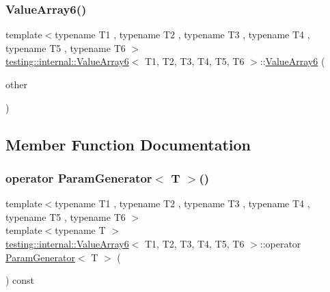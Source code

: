 \mbox{\label{classtesting_1_1internal_1_1_value_array6_a270702109b4185c6749310902fed7456}} 
\subsubsection{\texorpdfstring{ValueArray6()}{ValueArray6()}\hspace{0.1cm}{\footnotesize\ttfamily [2/2]}}
{\footnotesize\ttfamily template$<$typename T1 , typename T2 , typename T3 , typename T4 , typename T5 , typename T6 $>$ \\
\mbox{\hyperlink{classtesting_1_1internal_1_1_value_array6}{testing\+::internal\+::\+Value\+Array6}}$<$ T1, T2, T3, T4, T5, T6 $>$\+::\mbox{\hyperlink{classtesting_1_1internal_1_1_value_array6}{Value\+Array6}} (\begin{DoxyParamCaption}\item[{const \mbox{\hyperlink{classtesting_1_1internal_1_1_value_array6}{Value\+Array6}}$<$ T1, T2, T3, T4, T5, T6 $>$ \&}]{other }\end{DoxyParamCaption})\hspace{0.3cm}{\ttfamily [inline]}}



\subsection{Member Function Documentation}
\mbox{\label{classtesting_1_1internal_1_1_value_array6_ab6cb557146bca7cf5fcfa40f10dee9da}} 
\subsubsection{\texorpdfstring{operator ParamGenerator$<$ T $>$()}{operator ParamGenerator< T >()}}
{\footnotesize\ttfamily template$<$typename T1 , typename T2 , typename T3 , typename T4 , typename T5 , typename T6 $>$ \\
template$<$typename T $>$ \\
\mbox{\hyperlink{classtesting_1_1internal_1_1_value_array6}{testing\+::internal\+::\+Value\+Array6}}$<$ T1, T2, T3, T4, T5, T6 $>$\+::operator \mbox{\hyperlink{classtesting_1_1internal_1_1_param_generator}{Param\+Generator}}$<$ T $>$ (\begin{DoxyParamCaption}{ }\end{DoxyParamCaption}) const\hspace{0.3cm}{\ttfamily [inline]}}

